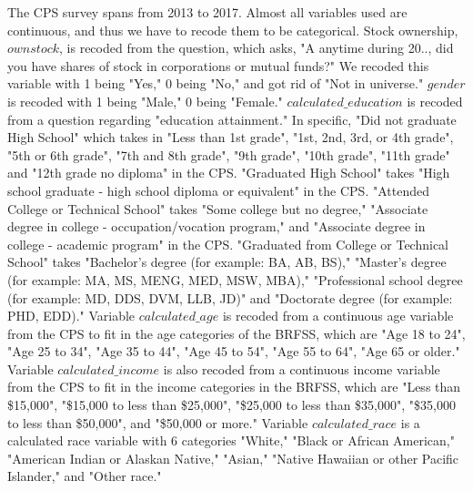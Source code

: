 \documentclass[11pt,a4paper,oldfontcommands]{memoir}
\begin{document}
{\begin{footnotesize}
The CPS survey spans from 2013 to 2017. Almost all variables used are continuous, and thus we have to recode them to be categorical. Stock ownership, $ownstock$, is recoded from the question, which asks, "A anytime during 20.., did you have shares of stock in corporations or mutual funds?" We recoded this variable with 1 being "Yes," 0 being "No," and got rid of "Not in universe." $gender$ is recoded with 1 being "Male," 0 being "Female." $calculated\_education$ is recoded from a question regarding "education attainment." In specific, "Did not graduate High School" which takes in "Less than 1st grade", "1st, 2nd, 3rd, or 4th grade", "5th or 6th grade", "7th and 8th grade", "9th grade", "10th grade", "11th grade" and "12th grade no diploma" in the CPS. "Graduated High School" takes "High school graduate - high school diploma or equivalent" in the CPS. "Attended College or Technical School" takes "Some college but no degree," "Associate degree in college - occupation/vocation program," and "Associate degree in college - academic program" in the CPS. "Graduated from College or Technical School" takes "Bachelor's degree (for example: BA, AB, BS)," "Master's degree (for example: MA, MS, MENG, MED, MSW, MBA)," "Professional school degree (for example: MD, DDS, DVM, LLB, JD)" and "Doctorate degree (for example: PHD, EDD)." Variable $calculated\_age$ is recoded from a continuous age variable from the CPS to fit in the age categories of the BRFSS, which are "Age 18 to 24", "Age 25 to 34", "Age 35 to 44", "Age 45 to 54", "Age 55 to 64", "Age 65 or older." Variable $calculated\_income$ is also recoded from a continuous income variable from the CPS to fit in the income categories in the BRFSS, which are "Less than \$15,000", "\$15,000 to less than \$25,000", "\$25,000 to less than \$35,000", "\$35,000 to less than \$50,000", and "\$50,000 or more." Variable $calculated\_race$ is a calculated race variable with 6 categories "White," "Black or African American," "American Indian or Alaskan Native," "Asian," "Native Hawaiian or other Pacific Islander," and "Other race."



\end{footnotesize}}
\end{document}

